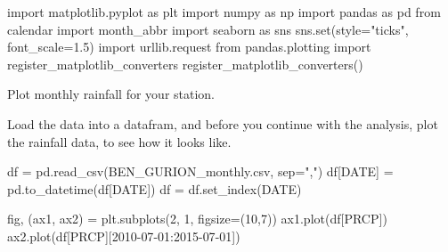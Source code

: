 \documentclass[
  letterpaper,
  DIV=11,
  numbers=noendperiod]{scrreprt}
\newenvironment{Shaded}{\begin{snugshade}}{\end{snugshade}}
\newcommand{\BuiltInTok}[1]{\textcolor[rgb]{0.00,0.23,0.31}{#1}}
\newcommand{\DecValTok}[1]{\textcolor[rgb]{0.68,0.00,0.00}{#1}}
\newcommand{\FloatTok}[1]{\textcolor[rgb]{0.68,0.00,0.00}{#1}}
\newcommand{\ImportTok}[1]{\textcolor[rgb]{0.00,0.46,0.62}{#1}}
\newcommand{\NormalTok}[1]{\textcolor[rgb]{0.00,0.23,0.31}{#1}}
\newcommand{\OperatorTok}[1]{\textcolor[rgb]{0.37,0.37,0.37}{#1}}
\newcommand{\StringTok}[1]{\textcolor[rgb]{0.13,0.47,0.30}{#1}}
\begin{document}
\begin{Shaded}
\begin{Highlighting}[]
\ImportTok{import}\NormalTok{ matplotlib.pyplot }\ImportTok{as}\NormalTok{ plt}
\ImportTok{import}\NormalTok{ numpy }\ImportTok{as}\NormalTok{ np}
\ImportTok{import}\NormalTok{ pandas }\ImportTok{as}\NormalTok{ pd}
\ImportTok{from}\NormalTok{ calendar }\ImportTok{import}\NormalTok{ month\_abbr}
\ImportTok{import}\NormalTok{ seaborn }\ImportTok{as}\NormalTok{ sns}
\NormalTok{sns.}\BuiltInTok{set}\NormalTok{(style}\OperatorTok{=}\StringTok{"ticks"}\NormalTok{, font\_scale}\OperatorTok{=}\FloatTok{1.5}\NormalTok{)}
\ImportTok{import}\NormalTok{ urllib.request}
\ImportTok{from}\NormalTok{ pandas.plotting }\ImportTok{import}\NormalTok{ register\_matplotlib\_converters}
\NormalTok{register\_matplotlib\_converters()}
\end{Highlighting}
\end{Shaded}

Plot monthly rainfall for your station.

Load the data into a datafram, and before you continue with the
analysis, plot the rainfall data, to see how it looks like.

\begin{Shaded}
\begin{Highlighting}[]
\NormalTok{df }\OperatorTok{=}\NormalTok{ pd.read\_csv(}\StringTok{\textquotesingle{}BEN\_GURION\_monthly.csv\textquotesingle{}}\NormalTok{, sep}\OperatorTok{=}\StringTok{","}\NormalTok{)}
\NormalTok{df[}\StringTok{\textquotesingle{}DATE\textquotesingle{}}\NormalTok{] }\OperatorTok{=}\NormalTok{ pd.to\_datetime(df[}\StringTok{\textquotesingle{}DATE\textquotesingle{}}\NormalTok{])}
\NormalTok{df }\OperatorTok{=}\NormalTok{ df.set\_index(}\StringTok{\textquotesingle{}DATE\textquotesingle{}}\NormalTok{)}

\NormalTok{fig, (ax1, ax2) }\OperatorTok{=}\NormalTok{ plt.subplots(}\DecValTok{2}\NormalTok{, }\DecValTok{1}\NormalTok{, figsize}\OperatorTok{=}\NormalTok{(}\DecValTok{10}\NormalTok{,}\DecValTok{7}\NormalTok{))}
\NormalTok{ax1.plot(df[}\StringTok{\textquotesingle{}PRCP\textquotesingle{}}\NormalTok{])}
\NormalTok{ax2.plot(df[}\StringTok{\textquotesingle{}PRCP\textquotesingle{}}\NormalTok{][}\StringTok{\textquotesingle{}2010{-}07{-}01\textquotesingle{}}\NormalTok{:}\StringTok{\textquotesingle{}2015{-}07{-}01\textquotesingle{}}\NormalTok{])}
\end{Highlighting}
\end{Shaded}
\end{document}
